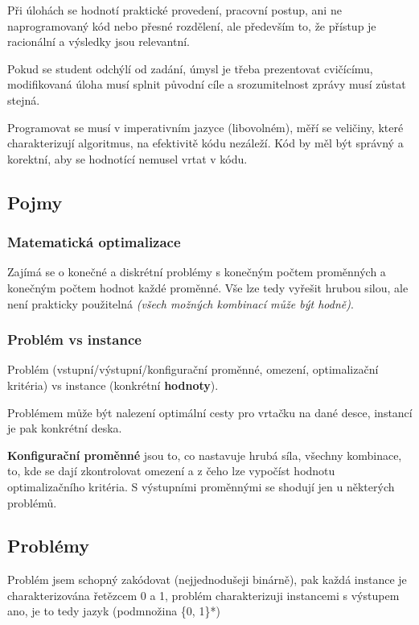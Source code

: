 Při úlohách se hodnotí praktické provedení, pracovní postup, ani ne naprogramovaný kód nebo přesné rozdělení, ale především to, že přístup je racionální a výsledky jsou relevantní.

Pokud se student odchýlí od zadání, úmysl je třeba prezentovat cvičícímu, modifikovaná úloha musí splnit původní cíle a srozumitelnost zprávy musí zůstat stejná.

Programovat se musí v imperativním jazyce (libovolném), měří se veličiny, které charakterizují algoritmus, na efektivitě kódu nezáleží. Kód by měl být správný a korektní, aby se hodnotící nemusel vrtat v kódu.

\newpage

\subsection{Pojmy}

\subsubsection*{Matematická optimalizace} 

Zajímá se o konečné a diskrétní problémy s konečným počtem proměnných a konečným počtem hodnot každé proměnné. Vše lze tedy vyřešit hrubou silou, ale není prakticky použitelná \textit{(všech možných kombinací může být hodně)}.

\subsubsection*{Problém vs instance}

Problém (vstupní/výstupní/konfigurační proměnné, omezení, optimalizační kri\-téria) vs instance (konkrétní \textbf{hodnoty}).

Problémem může být nalezení optimální cesty pro vrtačku na dané desce, instancí je pak konkrétní deska.

\textbf{Konfigurační proměnné} jsou to, co nastavuje hrubá síla, všechny kombinace, to, kde se dají zkontrolovat omezení a z čeho lze vypočíst hodnotu optimalizačního kritéria. S výstupními proměnnými se shodují jen u některých problémů.

\subsection{Problémy}

Problém jsem schopný zakódovat (nejjednodušeji binárně), pak každá instance je charakterizována řetězcem 0 a 1, problém charakterizuji instancemi s výstupem ano, je to tedy jazyk (podmnožina \{0, 1\}*)

